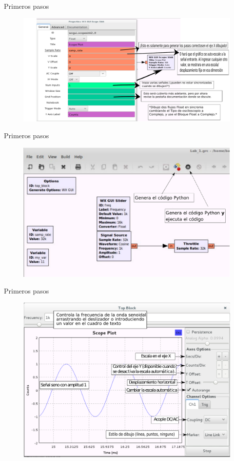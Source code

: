 \begin{frame}{Primeros pasos}
\begin{figure}[H]
\centering
\includegraphics[width=\textwidth]{lab1/pdf/lab117.pdf}
\end{figure}
\end{frame}

\begin{frame}{Primeros pasos}
\begin{figure}[H]
\centering
\includegraphics[width=\textwidth]{lab1/pdf/lab118.pdf}
\end{figure}
\end{frame}

\begin{frame}{Primeros pasos}
\begin{figure}[H]
\centering
\includegraphics[width=\textwidth, height=0.55\textwidth]{lab1/pdf/lab119.pdf}
\end{figure}
\end{frame}

